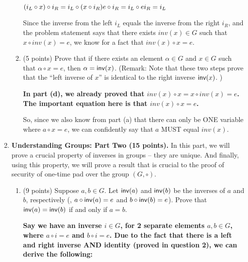 \documentclass[11pt]{article}
\begin{document}
\begin{enumerate}
\begin{enumerate}
{      $(i_L\circ x)\circ i_R = i_L\circ (x\circ i_R) \newline
      e\circ i_R = i_L\circ e \newline
      i_R = i_L$ \newline

      Since the inverse from the left $i_L$ equals the inverse from the right $i_R$, and the problem statement says that there exists $inv(x)\in G$ such that $x\circ inv(x) = e$, we know for a fact that $inv(x)\circ x = e$.
  }
     \newpage
  \item (5 points) Prove that if there exists an element $\alpha\in G$ and $x\in G$ such that $\alpha\circ x=e$, then $\alpha=\mathsf{inv}(x)$.  \newline
  (Remark: Note that these two steps prove that the ``left inverse of $x$'' is identical to the right inverse $\mathsf{inv}(x)$. ) \newline
  {\bfseries
      \newline
      \newline
      In part (d), we already proved that $inv(x)\circ x = x\circ inv(x) = e$. \newline
      The important equation here is that $inv(x)\circ x = e$. \newline
 
      So, since we also know from part (a) that there can only be ONE variable where $a\circ x = e$, we can confidently say that $a$ MUST equal $inv(x)$.
  }
     \newpage
 
 \end{enumerate}
 
    
  

 
 \item {\bfseries Understanding Groups: Part Two (15 points).}
  In this part, we will prove a crucial property of inverses in groups -- they are unique. And finally, using this property, we will prove a result that is crucial to the proof of security of one-time pad over the group $(G,\circ)$. 
 
 \begin{enumerate} 
   \item(9 points) Suppose $a,b\in G$. 
     Let $\mathsf{inv}(a)$ and $\mathsf{inv}(b)$ be the inverses of $a$ and $b$, respectively (\ie, $a\circ\mathsf{inv}(a)=e$ and $b\circ\mathsf{inv}(b)=e$). 
     Prove that $\mathsf{inv}(a)=\mathsf{inv}(b)$ if and only if $a=b$.  \newline
  {\bfseries
      \newline
      \newline
      Say we have an inverse $i\in G$, for 2 separate elements $a,b \in G$, where $a\circ i = e$ and $b\circ i = e$. Due to the fact that there is a left and right inverse AND identity (proved in question 2), we can derive the following: \newline

}
\end{enumerate}
\end{enumerate}
\end{document}
